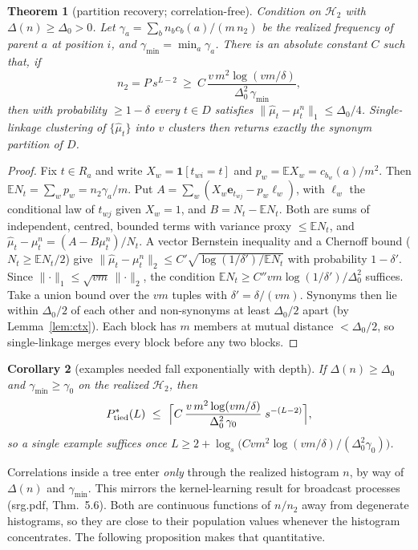 \documentclass[11pt]{article}
\newtheorem{theorem}{Theorem}
\newtheorem{corollary}[theorem]{Corollary}
\theoremstyle{definition}
\newcommand{\E}{\mathbb{E}}
\newcommand{\norm}[1]{\lVert #1\rVert}
\newcommand{\cH}{\mathcal H}
\begin{document}
\begin{theorem}[partition recovery; correlation-free]\label{thm:rec}
Condition on $\cH_2$ with $\Delta(n)\ge\Delta_0>0$. Let $\gamma_a=\sum_bn_bc_b(a)/(m\,n_2)$ be the
realized frequency of parent $a$ at position $i$, and $\gamma_{\min}=\min_a\gamma_a$. There is
an absolute constant $C$ such that, if
\[
n_2=P\,s^{L-2}\ \ge\ C\,\frac{v\,m^2\log(vm/\delta)}{\Delta_0^2\,\gamma_{\min}},
\]
then with probability $\ge1-\delta$ every $t\in D$ satisfies
$\norm{\hat\mu_t-\mu^n_t}_1\le\Delta_0/4$. Single-linkage clustering of
$\{\hat\mu_t\}$ into $v$ clusters then returns exactly the synonym partition of $D$.
\end{theorem}
\begin{proof}
Fix $t\in R_a$ and write $X_w=\mathbf 1[t_{wi}=t]$ and $p_w=\E X_w=c_{b_w}(a)/m^2$.
Then $\E N_t=\sum_wp_w=n_2\gamma_a/m$. Put $A=\sum_w(X_w\mathbf e_{t_{wj}}-p_w\ell_w)$, with
$\ell_w$ the conditional law of $t_{wj}$ given $X_w=1$, and $B=N_t-\E N_t$. Both are sums of
independent, centred, bounded terms with variance proxy $\le\E N_t$, and
$\hat\mu_t-\mu^n_t=(A-B\mu^n_t)/N_t$. A vector Bernstein inequality \cite{pinelis1994} and a
Chernoff bound ($N_t\ge\E N_t/2$) give
$\norm{\hat\mu_t-\mu^n_t}_2\le C'\sqrt{\log(1/\delta')/\E N_t}$ with probability $1-\delta'$.
Since $\norm{\cdot}_1\le\sqrt{vm}\,\norm{\cdot}_2$, the condition $\E N_t\ge C''vm\log(1/\delta')/\Delta_0^2$
suffices. Take a union bound over the $vm$ tuples with $\delta'=\delta/(vm)$. Synonyms then lie
within $\Delta_0/2$ of each other and non-synonyms at least $\Delta_0/2$ apart (by
Lemma~\ref{lem:ctx}). Each block has $m$ members at mutual distance $<\Delta_0/2$, so
single-linkage merges every block before any two blocks.
\end{proof}

\begin{corollary}[examples needed fall exponentially with depth]\label{cor:depth}
If $\Delta(n)\ge\Delta_0$ and $\gamma_{\min}\ge\gamma_0$ on the realized $\cH_2$, then
\[
P^*_{\rm tied}(L)\ \le\ \Big\lceil C\,\frac{v\,m^2\log(vm/\delta)}{\Delta_0^2\,\gamma_0}\;s^{-(L-2)}\Big\rceil ,
\]
so a \emph{single example} suffices once $L\ge2+\log_s\!\big(Cvm^2\log(vm/\delta)/(\Delta_0^2\gamma_0)\big)$.
\end{corollary}
\noindent Correlations inside a tree enter \emph{only} through the realized histogram $n$, by way of
$\Delta(n)$ and $\gamma_{\min}$. This mirrors the kernel-learning result for broadcast processes
(srg.pdf, Thm.~5.6). Both are continuous functions of $n/n_2$ away from degenerate histograms,
so they are close to their population values whenever the histogram concentrates. The following
proposition makes that quantitative.
\end{document}
